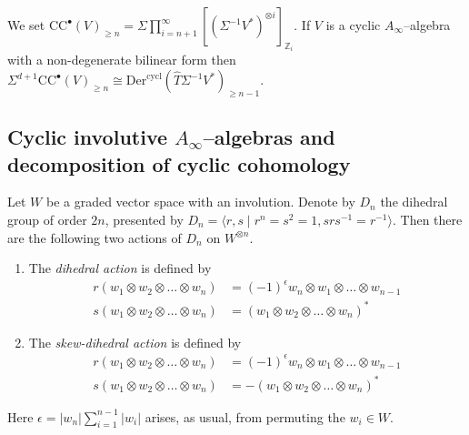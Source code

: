 \documentclass[british]{amsart}
\theoremstyle{plain}
\theoremstyle{definition}
{
\newaliascnt{{definition}}{theorem}\newtheorem{{definition}}[{definition}]{{Definition}}\aliascntresetthe{{definition}}\expandafterautorefname\endcsname{{Definition}}}
{
\newaliascnt{{remark}}{theorem}\newtheorem{{remark}}[{remark}]{{Remark}}\aliascntresetthe{{remark}}\expandafterautorefname\endcsname{{Remark}}}
{
\newaliascnt{{example}}{theorem}\newtheorem{{example}}[{example}]{{Example}}\aliascntresetthe{{example}}\expandafterautorefname\endcsname{{Example}}}
{
\newaliascnt{{examples}}{theorem}\newtheorem{{examples}}[{examples}]{{Examples}}\aliascntresetthe{{examples}}\expandafterautorefname\endcsname{{Examples}}}
{
\newaliascnt{{notation}}{theorem}\newtheorem{{notation}}[{notation}]{{Notation}}\aliascntresetthe{{notation}}\expandafterautorefname\endcsname{{Notation}}}
{
\newaliascnt{{convention}}{theorem}\newtheorem{{convention}}[{convention}]{{Convention}}\aliascntresetthe{{convention}}\expandafterautorefname\endcsname{{Convention}}}
\numberwithin{equation}{section}
\numberwithin{figure}{section}
\begin{document}
We set ${\mathrm{CC}}^\bullet(V)_{\geq n} = \Sigma \prod_{i=n+1}^{\infty}[(\Sigma^{-1}V^*)^{\otimes i}]_{\mathbb{Z}_i}$. If $V$ is a cyclic $A_\infty$--algebra with a non-degenerate bilinear form then $\Sigma^{d+1}{\mathrm{CC}}^\bullet(V)_{\geq n} \cong {\mathrm{Der}}^{\mathrm{cycl}}(\widehat{T}\Sigma^{-1}V^*)_{\geq n-1}$.

\subsection{Cyclic involutive \texorpdfstring{$A_\infty$--}{A-infinity }algebras and decomposition of cyclic cohomology}

\begin{definition}\label{def:dihedralactions}
Let $W$ be a graded vector space with an involution. Denote by $D_n$ the dihedral group of order $2n$, presented by $D_n = \langle r, s \mid r^n = s^2 = 1, srs^{-1}=r^{-1} \rangle $. Then there are the following two actions of $D_n$ on $W^{\otimes n}$.
\begin{enumerate}
\item \label{dihedralaction}The \emph{dihedral action} is defined by
\begin{align*}
r(w_1\otimes w_2 \otimes \dots \otimes w_n) &= (-1)^{\epsilon} w_n\otimes w_1 \otimes \dots\otimes w_{n-1}\\
s(w_1\otimes w_2 \otimes \dots \otimes w_n) &= (w_1\otimes w_2 \otimes \dots \otimes w_n)^*
\end{align*}
\item\label{skewdihedralaction} The \emph{skew-dihedral action} is defined by
\begin{align*}
r(w_1\otimes w_2 \otimes \dots \otimes w_n) &= (-1)^{\epsilon} w_n\otimes w_1 \otimes \dots\otimes w_{n-1}\\
s(w_1\otimes w_2 \otimes \dots \otimes w_n) &= -(w_1\otimes w_2 \otimes \dots \otimes w_n)^*
\end{align*}
\end{enumerate}
Here $\epsilon= {\lvert {w_n} \rvert}\sum_{i=1}^{n-1}{\lvert {w_i} \rvert}$ arises, as usual, from permuting the $w_i\in W$.
\end{definition}
\end{document}
